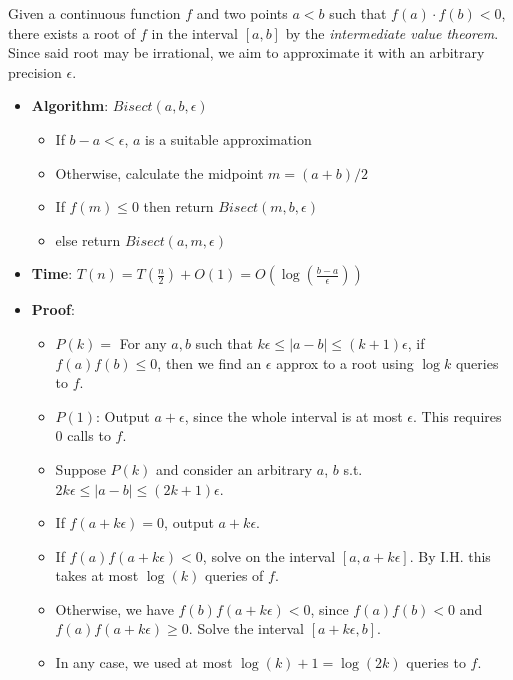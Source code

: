 \documentclass[10pt,landscape,a4paper]{article}
\begin{document}
\begin{multicols*}{3}
Given a continuous function $f$ and two points $a < b$ such that $f(a) \cdot f(b) < 0$, there exists a root of $f$ in the interval $\left[ a, b \right]$ by the \textit{intermediate value theorem}. Since said root may be irrational, we aim to approximate it with an arbitrary precision $\epsilon$.

\begin{itemize}
    \item \textbf{Algorithm}: $Bisect(a, b, \epsilon)$
    \begin{itemize}
        \item If $b - a < \epsilon$, $a$ is a suitable approximation
        \item Otherwise, calculate the midpoint $m = (a + b)/2$
        \item If $f(m) \le 0$ then return $Bisect(m, b, \epsilon)$
        \item else return $Bisect(a, m, \epsilon)$
    \end{itemize}
    \item \textbf{Time}: $T(n) = T(\frac{n}{2}) + O(1) = O(\log(\frac{b - a}{\epsilon}))$
    \item \textbf{Proof}:
    \begin{itemize}
        \item $P(k) =$ For any $a, b$ such that $k\epsilon \le |a - b| \le (k + 1)\epsilon$, if $f(a)f(b) \le 0$, then we find an $\epsilon$ approx to a root using $\log k$ queries to $f$.
        \item $P(1)$: Output $a + \epsilon$, since the whole interval is at most $\epsilon$. This requires $0$ calls to $f$.
        \item Suppose $P(k)$ and consider an arbitrary $a$, $b$ s.t. $2k\epsilon \le |a - b| \le (2k + 1)\epsilon$.
        \item If $f(a + k\epsilon) = 0$, output $a + k\epsilon$.
        \item If $f(a)f(a + k\epsilon) < 0$, solve on the interval $\left[ a, a + k\epsilon \right]$. By I.H. this takes at most $\log(k)$ queries of $f$.
        \item Otherwise, we have $f(b)f(a + k\epsilon) < 0$, since $f(a)f(b) < 0$ and $f(a)f(a + k\epsilon) \ge 0$. Solve the interval $\left[ a + k\epsilon, b \right]$.
        \item In any case, we used at most $\log(k) + 1 = \log(2k)$ queries to $f$.
    \end{itemize}
\end{itemize}


\end{multicols*}
\end{document}
